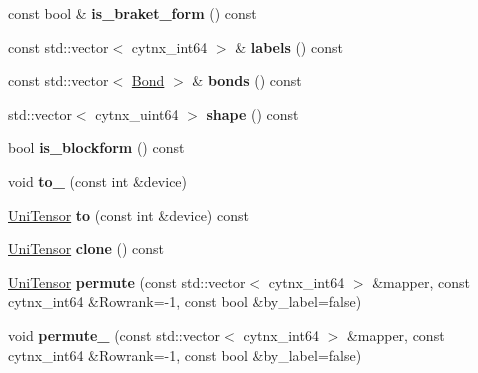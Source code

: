 \begin{DoxyCompactItemize}
const bool \& {\bfseries is\+\_\+braket\+\_\+form} () const
\item 
\mbox{\label{classcytnx_1_1UniTensor_a38073b2e56a0902146951155841c85bf}} 
const std\+::vector$<$ cytnx\+\_\+int64 $>$ \& {\bfseries labels} () const
\item 
\mbox{\label{classcytnx_1_1UniTensor_abc8348e0f56e2479dbe45273c3055b1b}} 
const std\+::vector$<$ \hyperlink{classcytnx_1_1Bond}{Bond} $>$ \& {\bfseries bonds} () const
\item 
\mbox{\label{classcytnx_1_1UniTensor_a38e60453fd51add542acdc43c8558f24}} 
std\+::vector$<$ cytnx\+\_\+uint64 $>$ {\bfseries shape} () const
\item 
\mbox{\label{classcytnx_1_1UniTensor_aac44ae40cb93f11f673ac0c1930ae319}} 
bool {\bfseries is\+\_\+blockform} () const
\item 
\mbox{\label{classcytnx_1_1UniTensor_a9aa08f2c848cc7d31bceac7656b4a976}} 
void {\bfseries to\+\_\+} (const int \&device)
\item 
\mbox{\label{classcytnx_1_1UniTensor_a025f4a2d775a9892b7f86aeff364fa49}} 
\hyperlink{classcytnx_1_1UniTensor}{Uni\+Tensor} {\bfseries to} (const int \&device) const
\item 
\mbox{\label{classcytnx_1_1UniTensor_ae1125e6627eb2f5268d5c21944d31434}} 
\hyperlink{classcytnx_1_1UniTensor}{Uni\+Tensor} {\bfseries clone} () const
\item 
\mbox{\label{classcytnx_1_1UniTensor_a77ab3a44a6bfb1ab80de3d186b626d62}} 
\hyperlink{classcytnx_1_1UniTensor}{Uni\+Tensor} {\bfseries permute} (const std\+::vector$<$ cytnx\+\_\+int64 $>$ \&mapper, const cytnx\+\_\+int64 \&Rowrank=-\/1, const bool \&by\+\_\+label=false)
\item 
\mbox{\label{classcytnx_1_1UniTensor_a9fc950c25515e43fd2c6deecc1e66a99}} 
void {\bfseries permute\+\_\+} (const std\+::vector$<$ cytnx\+\_\+int64 $>$ \&mapper, const cytnx\+\_\+int64 \&Rowrank=-\/1, const bool \&by\+\_\+label=false)

\end{DoxyCompactItemize}
